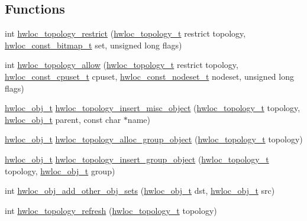 \subsection*{Functions}
\begin{DoxyCompactItemize}
\item 
int \hyperlink{a00194_ga6db81ed13ac0a9d70cc80372ab537815}{hwloc\+\_\+topology\+\_\+restrict} (\hyperlink{a00186_ga9d1e76ee15a7dee158b786c30b6a6e38}{hwloc\+\_\+topology\+\_\+t} restrict topology, \hyperlink{a00205_gae991a108af01d408be2776c5b2c467b2}{hwloc\+\_\+const\+\_\+bitmap\+\_\+t} set, unsigned long flags)
\item 
int \hyperlink{a00194_gaf955b190c0299dcfb5bc985d777f92a1}{hwloc\+\_\+topology\+\_\+allow} (\hyperlink{a00186_ga9d1e76ee15a7dee158b786c30b6a6e38}{hwloc\+\_\+topology\+\_\+t} restrict topology, \hyperlink{a00183_ga1f784433e9b606261f62d1134f6a3b25}{hwloc\+\_\+const\+\_\+cpuset\+\_\+t} cpuset, \hyperlink{a00183_ga2f5276235841ad66a79bedad16a5a10c}{hwloc\+\_\+const\+\_\+nodeset\+\_\+t} nodeset, unsigned long flags)
\item 
\hyperlink{a00185_ga79b8ab56877ef99ac59b833203391c7d}{hwloc\+\_\+obj\+\_\+t} \hyperlink{a00194_gad980782ade737900c5cf208946768c30}{hwloc\+\_\+topology\+\_\+insert\+\_\+misc\+\_\+object} (\hyperlink{a00186_ga9d1e76ee15a7dee158b786c30b6a6e38}{hwloc\+\_\+topology\+\_\+t} topology, \hyperlink{a00185_ga79b8ab56877ef99ac59b833203391c7d}{hwloc\+\_\+obj\+\_\+t} parent, const char $\ast$name)
\item 
\hyperlink{a00185_ga79b8ab56877ef99ac59b833203391c7d}{hwloc\+\_\+obj\+\_\+t} \hyperlink{a00194_ga4cea4741165faf5323931a9ed8786ef7}{hwloc\+\_\+topology\+\_\+alloc\+\_\+group\+\_\+object} (\hyperlink{a00186_ga9d1e76ee15a7dee158b786c30b6a6e38}{hwloc\+\_\+topology\+\_\+t} topology)
\item 
\hyperlink{a00185_ga79b8ab56877ef99ac59b833203391c7d}{hwloc\+\_\+obj\+\_\+t} \hyperlink{a00194_ga1fc6012b3e1c249b83f48cb7bcacaa5b}{hwloc\+\_\+topology\+\_\+insert\+\_\+group\+\_\+object} (\hyperlink{a00186_ga9d1e76ee15a7dee158b786c30b6a6e38}{hwloc\+\_\+topology\+\_\+t} topology, \hyperlink{a00185_ga79b8ab56877ef99ac59b833203391c7d}{hwloc\+\_\+obj\+\_\+t} group)
\item 
int \hyperlink{a00194_gad458715d3335df44849216cc123d1055}{hwloc\+\_\+obj\+\_\+add\+\_\+other\+\_\+obj\+\_\+sets} (\hyperlink{a00185_ga79b8ab56877ef99ac59b833203391c7d}{hwloc\+\_\+obj\+\_\+t} dst, \hyperlink{a00185_ga79b8ab56877ef99ac59b833203391c7d}{hwloc\+\_\+obj\+\_\+t} src)
\item 
int \hyperlink{a00194_ga698ecd640d2b76742bba3829a145cd9a}{hwloc\+\_\+topology\+\_\+refresh} (\hyperlink{a00186_ga9d1e76ee15a7dee158b786c30b6a6e38}{hwloc\+\_\+topology\+\_\+t} topology)
\end{DoxyCompactItemize}


